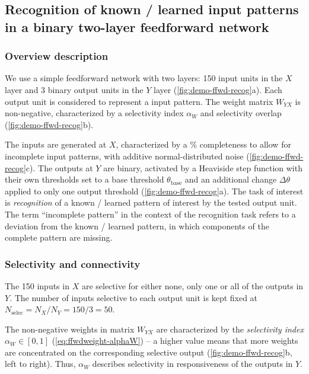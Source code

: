 \subsection{Recognition of known / learned input patterns in a binary two-layer feedforward network}

\subsubsection*{Overview description}

We use a simple feedforward network with two layers:
        150 input units in the $X$ layer
        and 3 binary output units in the $Y$ layer (\autoref{fig:demo-ffwd-recog}a).
    Each output unit is considered to represent a input pattern.
    The weight matrix $W_{YX}$ is non-negative, characterized by
        a selectivity index $\alpha_W$
        and selectivity overlap (\autoref{fig:demo-ffwd-recog}b).

The inputs are generated at $X$, characterized by
        a \% completeness to allow for incomplete input patterns,
        with additive normal-distributed noise (\autoref{fig:demo-ffwd-recog}c).
    The outputs at $Y$ are binary,
        activated by a Heaviside step function with
            their own thresholds set to a base threshold $\theta_{\mathrm{base}}$
            and an additional change $\Delta \theta$ applied to only one output threshold
            (\autoref{fig:demo-ffwd-recog}a).
    The task of interest is \textit{recognition} of a known / learned pattern of interest by the tested output unit.
    The term ``incomplete pattern'' in the context of the recognition task refers to a deviation from the known / learned pattern,
        in which components of the complete pattern are missing.


\subsubsection*{Selectivity and connectivity}

The 150 inputs in $X$ are selective for either none, only one or all of the outputs in $Y$.
    The number of inputs selective to each output unit is kept fixed at
        $N_{\text{selec}}=N_X/N_Y=150/3 = 50$.

The non-negative weights in matrix $W_{YX}$ are characterized by the \textit{selectivity index}
    $\alpha_W \in [0,1]$ (\autoref{eq:ffwdweight-alphaW})
    -- a higher value means that more weights are concentrated on the corresponding selective output (\autoref{fig:demo-ffwd-recog}b, left to right).
    Thus, $\alpha_W$ describes selectivity in responsiveness of the outputs in $Y$.

